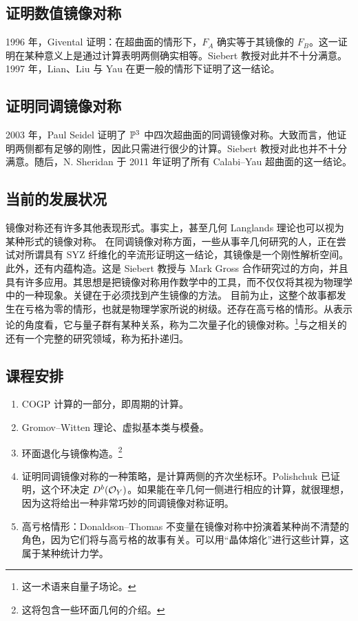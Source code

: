 \subsection{证明数值镜像对称}
1996 年，Givental 证明：在超曲面的情形下，$F_A$ 确实等于其镜像的 $F_B$。这一证明在某种意义上是通过计算表明两侧确实相等。Siebert 教授对此并不十分满意。1997 年，Lian、Liu 与 Yau 在更一般的情形下证明了这一结论。
\subsection{证明同调镜像对称}
2003 年，Paul Seidel 证明了 $\mathbb P^3$ 中四次超曲面的同调镜像对称。大致而言，他证明两侧都有足够的刚性，因此只需进行很少的计算。Siebert 教授对此也并不十分满意。随后，N. Sheridan 于 2011 年证明了所有 Calabi–Yau 超曲面的这一结论。
\subsection{当前的发展状况}
镜像对称还有许多其他表现形式。事实上，甚至几何 Langlands 理论也可以视为某种形式的镜像对称。
在同调镜像对称方面，一些从事辛几何研究的人，正在尝试对所谓具有 SYZ 纤维化的辛流形证明这一结论，其镜像是一个刚性解析空间。
此外，还有内蕴构造。这是 Siebert 教授与 Mark Gross 合作研究过的方向，并且具有许多应用。其思想是把镜像对称用作数学中的工具，而不仅仅将其视为物理学中的一种现象。关键在于必须找到产生镜像的方法。
目前为止，这整个故事都发生在亏格为零的情形，也就是物理学家所说的树级。还存在高亏格的情形。从表示论的角度看，它与量子群有某种关系，称为二次量子化的镜像对称。\footnote{这一术语来自量子场论。}与之相关的还有一个完整的研究领域，称为拓扑递归。
\subsection{课程安排}
\begin{enumerate}
\item COGP 计算的一部分，即周期的计算。
\item Gromov–Witten 理论、虚拟基本类与模叠。
\item 环面退化与镜像构造。\footnote{这将包含一些环面几何的介绍。}
\item 证明同调镜像对称的一种策略，是计算两侧的齐次坐标环。Polishchuk 已证明，这个环决定 $D^b(\mathcal O_Y)$。如果能在辛几何一侧进行相应的计算，就很理想，因为这将给出一种非常巧妙的同调镜像对称证明。
\item 高亏格情形：Donaldson–Thomas 不变量在镜像对称中扮演着某种尚不清楚的角色，因为它们将与高亏格的故事有关。可以用“晶体熔化”进行这些计算，这属于某种统计力学。
\end{enumerate}
